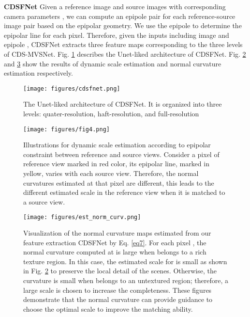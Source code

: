 \documentclass{article} \usepackage{iclr2022_conference,times}
\begin{document}
\textbf{CDSFNet}
Given a reference image  and  source images  with corresponding camera parameters , we can compute an epipole pair  for each reference-source image pair  based on the epipolar geometry. We use the epipole to determine the epipolar line for each pixel. Therefore, given the inputs including image  and epipole , CDSFNet extracts three feature maps corresponding to the three levels  of CDS-MVSNet. Fig. \ref{cdsfnet} describes the Unet-liked architecture of CDSFNet. Fig. \ref{fig4} and \ref{estimated_norm_curv} show the results of dynamic scale estimation and normal curvature estimation respectively.  

\begin{figure}[h]
\begin{center}
\texttt{[image: figures/cdsfnet.png]}
\end{center}
\caption{The Unet-liked architecture of CDSFNet. It is organized into three levels: quater-resolution, haft-resolution, and full-resolution}
\label{cdsfnet}
\end{figure}

\begin{figure}[h]
\begin{center}
\texttt{[image: figures/fig4.png]}
\end{center}
\caption{Illustrations for dynamic scale estimation according to epipolar constraint between reference and source views. Consider a pixel of reference view marked in red color, its epipolar line, marked in yellow, varies with each source view. Therefore, the normal curvatures estimated at that pixel are different, this leads to the different estimated scale in the reference view when it is matched to a source view.}
\label{fig4}
\end{figure}
\begin{figure}[h]
\begin{center}
\texttt{[image: figures/est\_norm\_curv.png]}
\end{center}
\caption{Visualization of the normal curvature maps estimated from our feature extraction CDSFNet by Eq. \ref{eq7}. For each pixel , the normal curvature computed at  is large when  belongs to a rich texture region. In this case, the estimated scale for  is small as shown in Fig. \ref{fig4} to preserve the local detail of the scenes. Otherwise, the curvature is small when  belongs to an untextured region; therefore, a large scale is chosen to increase the completeness. These figures demonstrate that the normal curvature can provide guidance to choose the optimal scale to improve the matching ability.}
\label{estimated_norm_curv}
\end{figure}
\end{document}
